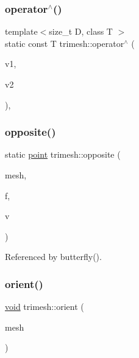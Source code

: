 \subsubsection{\texorpdfstring{operator$^\wedge$()}{operator^()}}
{\footnotesize\ttfamily template$<$size\+\_\+t D, class T $>$ \\
static const T trimesh\+::operator$^\wedge$ (\begin{DoxyParamCaption}\item[{const \hyperlink{classtrimesh_1_1Vec}{Vec}$<$ D, T $>$ \&}]{v1,  }\item[{const \hyperlink{classtrimesh_1_1Vec}{Vec}$<$ D, T $>$ \&}]{v2 }\end{DoxyParamCaption})\hspace{0.3cm}{\ttfamily [inline]}, {\ttfamily [static]}}

\mbox{\label{namespacetrimesh_a0b6c5f4d4341d1bfb328eaa00fcbf3a6}} 
\subsubsection{\texorpdfstring{opposite()}{opposite()}}
{\footnotesize\ttfamily static \hyperlink{namespacetrimesh_a325b99fd6454b22fa4c4bc3223271b2c}{point} trimesh\+::opposite (\begin{DoxyParamCaption}\item[{\hyperlink{classtrimesh_1_1TriMesh}{Tri\+Mesh} $\ast$}]{mesh,  }\item[{int}]{f,  }\item[{int}]{v }\end{DoxyParamCaption})\hspace{0.3cm}{\ttfamily [static]}}



Referenced by butterfly().

\mbox{\label{namespacetrimesh_a4b96f265ec05951dc2447a641fbfcabf}} 
\subsubsection{\texorpdfstring{orient()}{orient()}}
{\footnotesize\ttfamily \hyperlink{namespacetrimesh_a784ddfd979e1c579bda795a8edfc3f43}{void} trimesh\+::orient (\begin{DoxyParamCaption}\item[{\hyperlink{classtrimesh_1_1TriMesh}{Tri\+Mesh} $\ast$}]{mesh }\end{DoxyParamCaption})}

